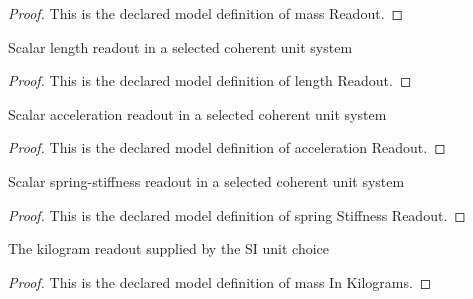 \begin{proof}
  This is the declared model definition of mass Readout.
\end{proof}
\begin{definition}
  \label{def:physics:phyx-mini-0199:phyxminiproblems-problemphyxmini0199-lengthreadout}
  Scalar length readout in a selected coherent unit system
\end{definition}
\begin{proof}
  This is the declared model definition of length Readout.
\end{proof}
\begin{definition}
  \label{def:physics:phyx-mini-0199:phyxminiproblems-problemphyxmini0199-accelerationreadout}
  Scalar acceleration readout in a selected coherent unit system
\end{definition}
\begin{proof}
  This is the declared model definition of acceleration Readout.
\end{proof}
\begin{definition}
  \label{def:physics:phyx-mini-0199:phyxminiproblems-problemphyxmini0199-springstiffnessreadout}
  Scalar spring-stiffness readout in a selected coherent unit system
\end{definition}
\begin{proof}
  This is the declared model definition of spring Stiffness Readout.
\end{proof}
\begin{definition}
  \label{def:physics:phyx-mini-0199:phyxminiproblems-problemphyxmini0199-massinkilograms}
  The kilogram readout supplied by the SI unit choice
\end{definition}
\begin{proof}
  This is the declared model definition of mass In Kilograms.
\end{proof}
